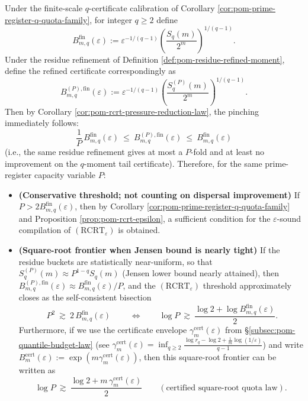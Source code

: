 \begin{corollary}\label{cor:pom-rcrt-self-consistent-sqrt-budget}
Under the finite-scale \(q\)-certificate calibration of Corollary \ref{cor:pom-prime-register-q-quota-family}, for integer \(q\ge 2\) define
\[
B_{m,q}^{\mathrm{fin}}(\varepsilon)
:=\varepsilon^{-1/(q-1)}\left(\frac{S_q(m)}{2^m}\right)^{\!1/(q-1)}.
\]
Under the residue refinement of Definition \ref{def:pom-residue-refined-moment}, define the refined certificate correspondingly as
\[
B_{m,q}^{(P),\mathrm{fin}}(\varepsilon)
:=\varepsilon^{-1/(q-1)}\left(\frac{S_q^{(P)}(m)}{2^m}\right)^{\!1/(q-1)}.
\]
Then by Corollary \ref{cor:pom-rcrt-pressure-reduction-law}, the pinching immediately follows:
\[
\boxed{\;
\frac{1}{P}\,B_{m,q}^{\mathrm{fin}}(\varepsilon)
\ \le\
B_{m,q}^{(P),\mathrm{fin}}(\varepsilon)
\ \le\
B_{m,q}^{\mathrm{fin}}(\varepsilon)\;}
\]
(i.e., the same residue refinement gives at most a \(P\)-fold and at least no improvement on the \(q\)-moment tail certificate).
Therefore, for the same prime-register capacity variable \(P\):
\begin{itemize}
  \item \textbf{(Conservative threshold; not counting on dispersal improvement)} If \(P>2B_{m,q}^{\mathrm{fin}}(\varepsilon)\), then by Corollary \ref{cor:pom-prime-register-q-quota-family} and Proposition \ref{prop:pom-rcrt-epsilon}, a sufficient condition for the \(\varepsilon\)-sound compilation of \((\mathrm{RCRT}_\varepsilon)\) is obtained.
  \item \textbf{(Square-root frontier when Jensen bound is nearly tight)} If the residue buckets are statistically near-uniform, so that \(S_q^{(P)}(m)\approx P^{1-q}S_q(m)\) (Jensen lower bound nearly attained), then \(B_{m,q}^{(P),\mathrm{fin}}(\varepsilon)\approx B_{m,q}^{\mathrm{fin}}(\varepsilon)/P\), and the \((\mathrm{RCRT}_\varepsilon)\) threshold approximately closes as the self-consistent bisection
  \[
  \boxed{\;
  P^2\ \gtrsim\ 2\,B_{m,q}^{\mathrm{fin}}(\varepsilon)\;}
  \qquad
  \Longleftrightarrow
  \qquad
  \log P\ \gtrsim\ \frac{\log 2+\log B_{m,q}^{\mathrm{fin}}(\varepsilon)}{2}.
  \]
  Furthermore, if we use the certificate envelope \(\gamma_m^{\mathrm{cert}}(\varepsilon)\) from \S\ref{subsec:pom-quantile-budget-law} (see \(\gamma_m^{\mathrm{cert}}(\varepsilon)=\inf_{q\ge 2}\frac{\log r_q-\log 2+\frac{1}{m}\log(1/\varepsilon)}{q-1}\)) and write \(B_m^{\mathrm{cert}}(\varepsilon):=\exp(m\gamma_m^{\mathrm{cert}}(\varepsilon))\), then this square-root frontier can be written as
  \[
  \boxed{\;
  \log P\ \gtrsim\ \frac{\log 2+m\,\gamma_m^{\mathrm{cert}}(\varepsilon)}{2}
  \qquad(\text{certified square-root quota law}).\;}
  \]
\end{itemize}
\end{corollary}

